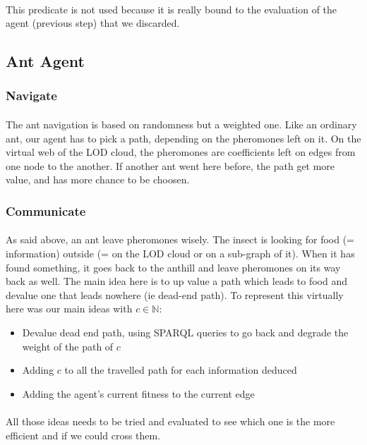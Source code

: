\documentclass{article}
\newenvironment{itemh}[0]{\begin{itemize}[font=\color{mygray} \small]}{\end{itemize}}
\begin{document}
			\paragraph{}
				This predicate is not used because it is really bound to the evaluation of the agent (previous step) that we discarded.
	\subsection{Ant Agent}
		\subsubsection{Navigate}
			\paragraph{}
				The ant navigation is based on randomness but a weighted one.
				Like an ordinary ant, our agent has to pick a path, depending on the pheromones left on it.
				On the virtual web of the LOD cloud, the pheromones are coefficients left on edges from one node to the another.
				If another ant went here before, the path get more value, and has more chance to be choosen.
		\subsubsection{Communicate}
			\paragraph{}
				As said above, an ant leave pheromones wisely.
				The insect is looking for food (= information) outside (= on the LOD cloud or on a sub-graph of it).
				When it has found something, it goes back to the anthill and leave pheromones on its way back as well.
				The main idea here is to up value a path which leads to food and devalue one that leads nowhere (ie dead-end path).
				To represent this virtually here was our main ideas with $c \in \mathbb{N}$:
			\begin{itemh}
			\item Devalue dead end path, using SPARQL queries to go back and degrade the weight of the path of $c$
			\item Adding $c$ to all the travelled path for each information deduced
			\item Adding the agent's current fitness to the current edge
			\end{itemh}
			\paragraph{}
				All those ideas needs to be tried and evaluated to see which one is the more efficient and if we could cross them.
\end{document}
